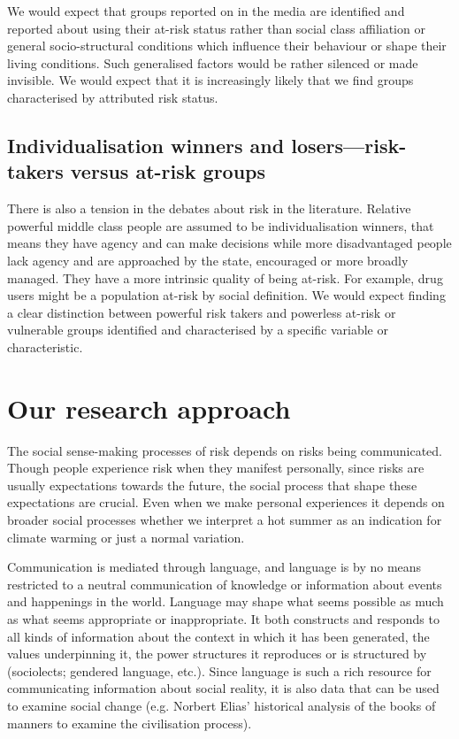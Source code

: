 We would expect that groups reported on in the media are identified and reported about using their at-risk status rather than social class affiliation or general socio-structural conditions which influence their behaviour or shape their living conditions. Such generalised factors would be rather silenced or made invisible. We would expect that it is increasingly likely that we find groups characterised by attributed risk status.

\subsection*{Individualisation winners and losers---risk-takers versus at-risk groups}

There is also a tension in the debates about risk in the literature. Relative powerful middle class people are assumed to be individualisation winners, that means they have agency and can make decisions while more disadvantaged people lack agency and are approached by the state, encouraged or more broadly managed. They have a more intrinsic quality of being at-risk. For example, drug users might be a population at-risk by social definition. We would expect finding a clear distinction between powerful risk takers and powerless at-risk or vulnerable groups identified and characterised by a specific variable or characteristic.


\section{Our research approach}

The social sense-making processes of risk depends on risks being communicated. Though people experience risk when they manifest personally, since risks are usually expectations towards the future, the social process that shape these expectations are crucial. Even when we make personal experiences it depends on broader social processes whether we interpret a hot summer as an indication for climate warming or just a normal variation.

Communication is mediated through language, and language is by no means restricted to a neutral communication of knowledge or information about events and happenings in the world. Language may shape what seems possible as much as what seems appropriate or inappropriate. It both constructs and responds to all kinds of information about the context in which it has been generated, the values underpinning it, the power structures it reproduces or is structured by (sociolects; gendered language, etc.). Since language is such a rich resource for communicating information about social reality, it is also data that can be used to examine social change (e.g. Norbert Elias' historical analysis of the books of manners to examine the civilisation process). 


